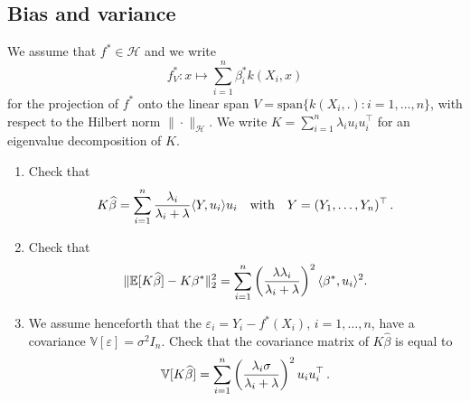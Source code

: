 \documentclass[a4paper,10pt,fleqn]{article}
\newcommand{\R}{\ensuremath{\mathbb{R}}}
\newcommand{\E}{\ensuremath{\mathbb{E}}}
\newcommand{\1}{\ensuremath{\mathbbm{1}}}
\begin{document}
\subsection*{Bias and variance}
We assume that $f^*\in\mathcal{H}$ and we write 
$$f^*_{V}: x \mapsto \sum_{i=1}^n \beta_{i}^*k(X_{i},x)$$ 
for the projection of $f^*$ onto the linear span $V=\textrm{span}\{k(X_{i},.): i=1,\ldots,n\}$, with respect to the Hilbert norm $\|\cdot\|_{\mathcal{H}}$. We write $K=\sum_{i=1}^n \lambda_{i}u_{i}u_{i}^\top$ for an eigenvalue decomposition of $K$.
\begin{enumerate}
	\item Check that 
	$$K\widehat \beta= \sum_{i=1}^n {\lambda_{i}\over \lambda_{i}+\lambda} \langle Y, u_{i}\rangle u_{i}\quad\textrm{with}\quad Y=(Y_{1},\ldots,Y_{n})^\top\,.$$

%
	\item Check that
	$$\|\E[K\widehat \beta]-K\beta^*\|_2^2=\sum_{i=1}^n \left( \lambda\lambda_{i}\over \lambda_{i}+\lambda\right)^2 \langle \beta^*, u_{i}\rangle^2.$$
%
%
	\item We assume henceforth that the $\varepsilon_{i}=Y_{i}-f^*(X_{i})$, $i=1,\ldots,n$, have a covariance $\mathbb{V}[\varepsilon]=\sigma^2I_{n}$.
	Check that the covariance matrix of $K\widehat \beta$ is equal to
	$$\mathbb{V}[K\widehat \beta]=\sum_{i=1}^n \left(\lambda_{i}\sigma\over \lambda_{i}+\lambda\right)^2u_{i}u_{i}^\top\,.$$


\end{enumerate}
\end{document}
